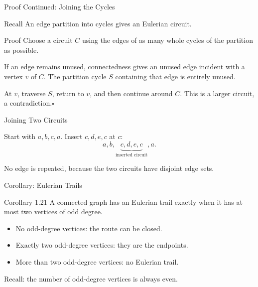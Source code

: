 \documentclass[aspectratio=169,11pt]{beamer}
\begin{document}
\begin{frame}{Proof Continued: Joining the Cycles}
\large
\begin{block}{Recall}
An edge partition into cycles gives an Eulerian circuit.
\end{block}
\begin{block}{Proof}
\normalsize Choose a circuit $C$ using the edges of as many whole cycles of the partition as possible.\par\medskip If an edge remains unused, connectedness gives an unused edge incident with a vertex $v$ of $C$. The partition cycle $S$ containing that edge is entirely unused.\par\medskip At $v$, traverse $S$, return to $v$, and then continue around $C$. This is a larger circuit, a contradiction.\hfill$\square$
\end{block}

\end{frame}

\begin{frame}{Joining Two Circuits}
\large
\begin{center}\end{center}Start with $a,b,c,a$. Insert $c,d,e,c$ at $c$:\[a,b,\underbrace{c,d,e,c}_{\text{inserted circuit}},a.\]\par No edge is repeated, because the two circuits have disjoint edge sets.
\end{frame}

\begin{frame}{Corollary: Eulerian Trails}
\large
\begin{block}{Corollary 1.21}
A connected graph has an Eulerian trail exactly when it has at most two vertices of odd degree.
\end{block}
\begin{itemize}\setlength{\itemsep}{.22cm}
\item No odd-degree vertices: the route can be closed.
\item Exactly two odd-degree vertices: they are the endpoints.
\item More than two odd-degree vertices: no Eulerian trail.
\end{itemize}\medskip Recall: the number of odd-degree vertices is always even.
\end{frame}
\end{document}

